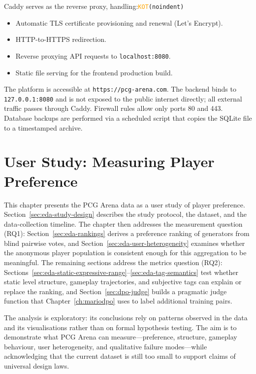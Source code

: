 \documentclass[shortabstract, mgr, english]{iithesis}
\newcommand{\DEBUG}[1]{{#1}} %
\newcommand{\KOT}[1]{\DEBUG{\tt{\textcolor{orange}{KOT}(}{#1}{)}}}
\begin{document}
\noindent
Caddy serves as the reverse proxy, handling:\KOT{noindent}

\begin{itemize}[nosep]
    \item Automatic TLS certificate provisioning and renewal (Let's Encrypt).
    \item HTTP-to-HTTPS redirection.
    \item Reverse proxying API requests to \texttt{localhost:8080}.
    \item Static file serving for the frontend production build.
\end{itemize}

The platform is accessible at \texttt{https://pcg-arena.com}. The backend binds to
\texttt{127.0.0.1:8080} and is not exposed to the public internet directly; all external
traffic passes through Caddy. Firewall rules allow only ports 80 and 443. Database backups
are performed via a scheduled script that copies the SQLite file to a timestamped archive.




\chapter{User Study: Measuring Player Preference}
\label{ch:eda}

This chapter presents the PCG Arena data as a user study of player
preference. Section~\ref{sec:eda-study-design} describes the study protocol,
the dataset, and the data-collection timeline. The chapter then addresses the
measurement question (RQ1): Section~\ref{sec:eda-rankings} derives a
preference ranking of generators from blind pairwise votes, and
Section~\ref{sec:eda-user-heterogeneity} examines whether the anonymous player
population is consistent enough for this aggregation to be meaningful. The
remaining sections address the metrics question (RQ2):
Sections~\ref{sec:eda-static-expressive-range}--\ref{sec:eda-tag-semantics}
test whether static level structure, gameplay trajectories, and subjective
tags can explain or replace the ranking, and Section~\ref{sec:dpo-judge}
builds a pragmatic judge function that Chapter~\ref{ch:mariodpo} uses to label
additional training pairs.

The analysis is exploratory: its conclusions rely on patterns observed in the data and its visualisations rather than on formal hypothesis testing. The aim is to demonstrate what PCG Arena can measure---preference, structure, gameplay behaviour, user heterogeneity, and qualitative failure modes---while acknowledging that the current dataset is still too small to support claims of universal design laws.
\end{document}
